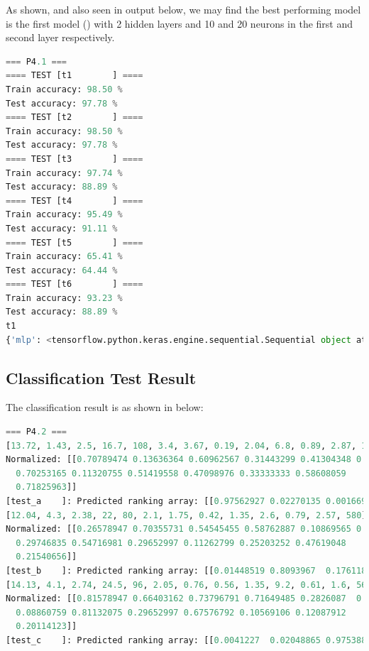 \documentclass{tron}
\begin{document}
As  shown, and also seen in output  below, we may find the best performing model is the first model () with 2 hidden layers and 10 and 20 neurons in the first and second layer respectively.

	

\begin{lstlisting}[language=python, style=mystyle:output, label=output:result, caption=Python Output]
=== P4.1 ===
==== TEST [t1        ] ====
Train accuracy: 98.50 %
Test accuracy: 97.78 %
==== TEST [t2        ] ====
Train accuracy: 98.50 %
Test accuracy: 97.78 %
==== TEST [t3        ] ====
Train accuracy: 97.74 %
Test accuracy: 88.89 %
==== TEST [t4        ] ====
Train accuracy: 95.49 %
Test accuracy: 91.11 %
==== TEST [t5        ] ====
Train accuracy: 65.41 %
Test accuracy: 64.44 %
==== TEST [t6        ] ====
Train accuracy: 93.23 %
Test accuracy: 88.89 %
t1
{'mlp': <tensorflow.python.keras.engine.sequential.Sequential object at 0x7f8a36ff8a30>, 'max_epoch': 250, 'train_accuracy': 98.49624037742615, 'test_accuracy': 97.77777791023254}
\end{lstlisting}


\newpage
\subsection{Classification Test Result \label{sec:4:2}}
The classification result is as shown in  below:
\begin{lstlisting}[language=python, style=mystyle:output, label=output:classification-result, caption=Test Result]
=== P4.2 ===
[13.72, 1.43, 2.5, 16.7, 108, 3.4, 3.67, 0.19, 2.04, 6.8, 0.89, 2.87, 1285]
Normalized: [[0.70789474 0.13636364 0.60962567 0.31443299 0.41304348 0.83448276
  0.70253165 0.11320755 0.51419558 0.47098976 0.33333333 0.58608059
  0.71825963]]
[test_a    ]: Predicted ranking array: [[0.97562927 0.02270135 0.00166926]], Classified as: 1
[12.04, 4.3, 2.38, 22, 80, 2.1, 1.75, 0.42, 1.35, 2.6, 0.79, 2.57, 580]
Normalized: [[0.26578947 0.70355731 0.54545455 0.58762887 0.10869565 0.3862069
  0.29746835 0.54716981 0.29652997 0.11262799 0.25203252 0.47619048
  0.21540656]]
[test_b    ]: Predicted ranking array: [[0.01448519 0.8093967  0.17611817]], Classified as: 2
[14.13, 4.1, 2.74, 24.5, 96, 2.05, 0.76, 0.56, 1.35, 9.2, 0.61, 1.6, 560]
Normalized: [[0.81578947 0.66403162 0.73796791 0.71649485 0.2826087  0.36896552
  0.08860759 0.81132075 0.29652997 0.67576792 0.10569106 0.12087912
  0.20114123]]
[test_c    ]: Predicted ranking array: [[0.0041227  0.02048865 0.9753887 ]], Classified as: 3
\end{lstlisting}
\end{document}
